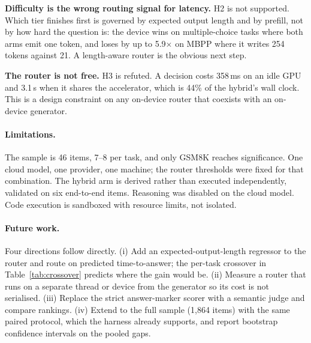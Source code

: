 \documentclass[11pt,a4paper]{article}
\begin{document}
\textbf{Difficulty is the wrong routing signal for latency.} H2 is not
supported. Which tier finishes first is governed by expected output length and
by prefill, not by how hard the question is: the device wins on multiple-choice
tasks where both arms emit one token, and loses by up to 5.9$\times$ on MBPP
where it writes 254 tokens against 21. A
length-aware router is the obvious next step.

\textbf{The router is not free.} H3 is refuted. A decision costs
358\,ms on an idle GPU and 3.1\,s when it shares
the accelerator, which is 44\% of the hybrid's wall clock. This
is a design constraint on any on-device router that coexists with an on-device
generator.

\paragraph{Limitations.}
The sample is 46 items, 7--8 per task, and only GSM8K reaches
significance. One cloud model, one provider, one machine; the router thresholds
were fixed for that combination. The hybrid arm is derived rather than executed
independently, validated on six end-to-end items. Reasoning was disabled on the
cloud model. Code execution is sandboxed with resource limits, not isolated.

\paragraph{Future work.}
Four directions follow directly. (i) Add an expected-output-length regressor to
the router and route on predicted time-to-answer; the per-task crossover in
Table~\ref{tab:crossover} predicts where the gain would be. (ii) Measure a
router that runs on a separate thread or device from the generator so its cost
is not serialised. (iii) Replace the strict answer-marker scorer with a
semantic judge and compare rankings. (iv) Extend to the full sample
(1{,}864 items) with the same paired protocol, which the harness already
supports, and report bootstrap confidence intervals on the pooled gaps.
\end{document}

